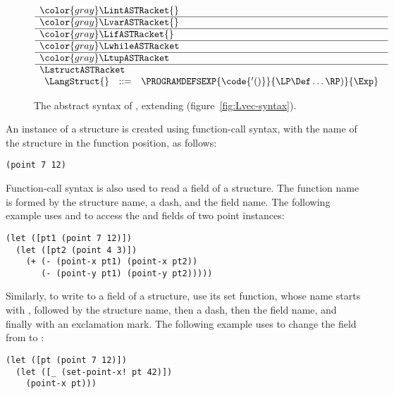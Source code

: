 \documentclass[7x10]{TimesAPriori_MIT}%
\newcommand{\gray}[1]{{\color{gray} #1}}
\numberwithin{theorem}{chapter}
\numberwithin{definition}{chapter}
\numberwithin{equation}{chapter}
\begin{document}
{\begin{figure}[tbp]
\centering
\begin{tcolorbox}[colback=white]
    \small
\[
\begin{array}{l}
  \gray{\LintASTRacket{}} \\ \hline
  \gray{\LvarASTRacket{}} \\ \hline
  \gray{\LifASTRacket{}} \\ \hline
  \gray{\LwhileASTRacket} \\ \hline
  \gray{\LtupASTRacket} \\  \hline
  \LstructASTRacket \\
\begin{array}{lcl}
  \LangStruct{} &::=& \PROGRAMDEFSEXP{\code{'()}}{\LP\Def\ldots\RP)}{\Exp}
\end{array}
\end{array}
\]
\end{tcolorbox}

\caption{The abstract syntax of \LangStruct{}, extending \LangVec{}
  (figure~\ref{fig:Lvec-syntax}).}
\label{fig:Lstruct-syntax}
\end{figure}

An instance of a structure is created using function-call syntax, with
the name of the structure in the function position, as follows:
\begin{lstlisting}
(point 7 12)
\end{lstlisting}
Function-call syntax is also used to read a field of a structure. The
function name is formed by the structure name, a dash, and the field
name. The following example uses  and  to
access the  and  fields of two point instances:
\begin{center}
\begin{lstlisting}
(let ([pt1 (point 7 12)])
  (let ([pt2 (point 4 3)])
    (+ (- (point-x pt1) (point-x pt2))
       (- (point-y pt1) (point-y pt2)))))
\end{lstlisting}
\end{center}
Similarly, to write to a field of a structure, use its set function,
whose name starts with , followed by the structure name,
then a dash, then the field name, and finally with an exclamation
mark. The following example uses  to change the
 field from  to :
\begin{center}
  \begin{lstlisting}
(let ([pt (point 7 12)])
  (let ([_ (set-point-x! pt 42)])
    (point-x pt)))
\end{lstlisting}
\end{center}

}
\end{document}
